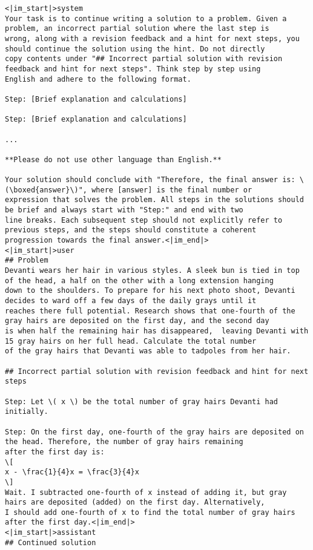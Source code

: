 \begin{tcolorbox}[brown_box, title = {{Prompt Template 1.2.2 --- Generator generates continuations for incorrect partial solutions}}]\tiny
\begin{verbatim}
<|im_start|>system
Your task is to continue writing a solution to a problem. Given a problem, an incorrect partial solution where the last step is 
wrong, along with a revision feedback and a hint for next steps, you should continue the solution using the hint. Do not directly 
copy contents under "## Incorrect partial solution with revision feedback and hint for next steps". Think step by step using
English and adhere to the following format.

Step: [Brief explanation and calculations]

Step: [Brief explanation and calculations]

...

**Please do not use other language than English.**

Your solution should conclude with "Therefore, the final answer is: \(\boxed{answer}\)", where [answer] is the final number or 
expression that solves the problem. All steps in the solutions should be brief and always start with "Step:" and end with two 
line breaks. Each subsequent step should not explicitly refer to previous steps, and the steps should constitute a coherent
progression towards the final answer.<|im_end|>
<|im_start|>user
## Problem
Devanti wears her hair in various styles. A sleek bun is tied in top of the head, a half on the other with a long extension hanging
down to the shoulders. To prepare for his next photo shoot, Devanti decides to ward off a few days of the daily grays until it 
reaches there full potential. Research shows that one-fourth of the gray hairs are deposited on the first day, and the second day 
is when half the remaining hair has disappeared,  leaving Devanti with 15 gray hairs on her full head. Calculate the total number
of the gray hairs that Devanti was able to tadpoles from her hair.

## Incorrect partial solution with revision feedback and hint for next steps

Step: Let \( x \) be the total number of gray hairs Devanti had initially.

Step: On the first day, one-fourth of the gray hairs are deposited on the head. Therefore, the number of gray hairs remaining 
after the first day is:
\[
x - \frac{1}{4}x = \frac{3}{4}x
\]
Wait. I subtracted one-fourth of x instead of adding it, but gray hairs are deposited (added) on the first day. Alternatively, 
I should add one-fourth of x to find the total number of gray hairs after the first day.<|im_end|>
<|im_start|>assistant
## Continued solution


\end{verbatim}
\end{tcolorbox}
